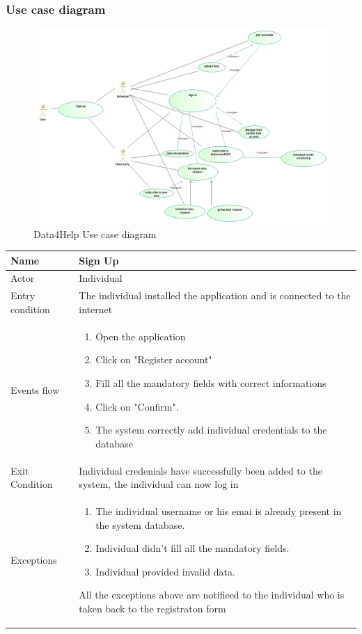 \subsubsection{Use case diagram}
\begin{figure}
  \includegraphics[width=0.95\linewidth]{resources/UML/GeneralUseCase.png}
  \caption{Data4Help Use case diagram}
  \label{fig:Use case diagram}
\end{figure}


\begin{tabular}{|l|p{11cm}|}
    \hline
    Name & Sign Up
    \\ \hline
    Actor & Individual
    \\ \hline 
    Entry condition & The individual installed the application and is connected to the internet
    \\ \hline
    Events flow &
    \begin{enumerate}
    \item Open the application
    \item Click on "Register account"
    \item Fill all the mandatory fields with correct informations
    \item Click on "Confirm".
    \item The system correctly add individual credentials to the database
    \end{enumerate}
     \\ \hline
     Exit Condition & Individual credenials have successfully been added to the system,
     the individual can now log in     
     \\
    \hline
    Exceptions &
        \begin{enumerate}
    \item The individual username or his emai is already present in the system database.
    \item Individual didn't fill all the mandatory fields.
    \item Individual provided invalid data.
  
    \end{enumerate}
    All the exceptions above are notifieed to the individual who is taken back to the registraton form
      \\
    \hline
\end{tabular}



